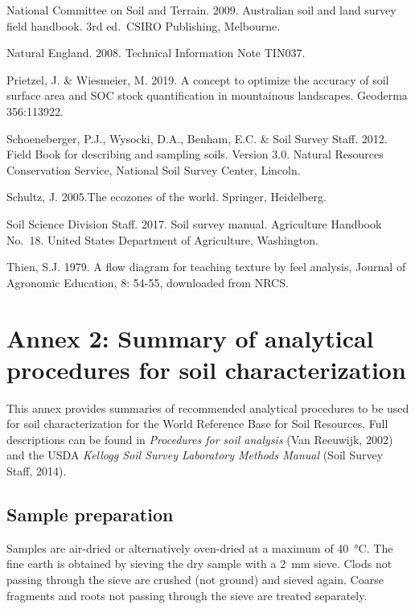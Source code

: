 \documentclass[
  letterpaper,
  DIV=11,
  numbers=noendperiod]{scrreprt}
\begin{document}
National Committee on Soil and Terrain. 2009. Australian soil and land
survey field handbook. 3rd ed.~CSIRO Publishing, Melbourne.

Natural England. 2008. Technical Information Note TIN037.

Prietzel, J. \& Wiesmeier, M. 2019. A concept to optimize the accuracy
of soil surface area and SOC stock quantification in mountainous
landscapes. Geoderma 356:113922.

Schoeneberger, P.J., Wysocki, D.A., Benham, E.C. \& Soil Survey Staff.
2012. Field Book for describing and sampling soils. Version 3.0. Natural
Resources Conservation Service, National Soil Survey Center, Lincoln.

Schultz, J. 2005.The ecozones of the world. Springer, Heidelberg.

Soil Science Division Staff. 2017. Soil survey manual. Agriculture
Handbook No.~18. United States Department of Agriculture, Washington.

Thien, S.J. 1979. A flow diagram for teaching texture by feel analysis,
Journal of Agronomic Education, 8: 54-55, downloaded from NRCS.


\hypertarget{annex-2-summary-of-analytical-procedures-for-soil-characterization}{%
\chapter{Annex 2: Summary of analytical procedures for soil
characterization}\label{annex-2-summary-of-analytical-procedures-for-soil-characterization}}

This annex provides summaries of recommended analytical procedures to be
used for soil characterization for the World Reference Base for Soil
Resources. Full descriptions can be found in \emph{Procedures for soil
analysis} (Van Reeuwijk, 2002) and the USDA \emph{Kellogg Soil Survey
Laboratory Methods Manual} (Soil Survey Staff, 2014).

\hypertarget{sample-preparation}{%
\section{Sample preparation}\label{sample-preparation}}

Samples are air-dried or alternatively oven-dried at a maximum of 40~°C.
The fine earth is obtained by sieving the dry sample with a 2~mm sieve.
Clods not passing through the sieve are crushed (not ground) and sieved
again. Coarse fragments and roots not passing through the sieve are
treated separately.
\end{document}
